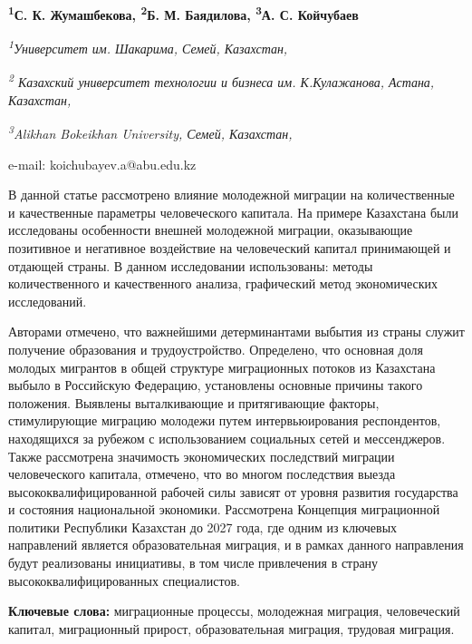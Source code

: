 {{\bfseries \textsuperscript{1}С. К. Жумашбекова, \textsuperscript{2}Б. М.
Баядилова, \textsuperscript{3}А. С. Койчубаев\textsuperscript{\envelope }}

\emph{\textsuperscript{1}Университет им. Шакарима, Семей, Казахстан,}

\emph{\textsuperscript{2} Казахский университет технологии и бизнеса им.
К.Кулажанова, Астана, Казахстан,}

\emph{\textsuperscript{3}Alikhan Bokeikhan University, Семей,
Казахстан,}

e-mail: koichubayev.a@abu.edu.kz

В данной статье рассмотрено влияние молодежной миграции на
количественные и качественные параметры человеческого капитала. На
примере Казахстана были исследованы особенности внешней молодежной
миграции, оказывающие позитивное и негативное воздействие на
человеческий капитал принимающей и отдающей страны. В данном
исследовании использованы: методы количественного и качественного
анализа, графический метод экономических исследований.

Авторами отмечено, что важнейшими детерминантами выбытия из страны
служит получение образования и трудоустройство. Определено, что основная
доля молодых мигрантов в общей структуре миграционных потоков из
Казахстана выбыло в Российскую Федерацию, установлены основные причины
такого положения. Выявлены выталкивающие и притягивающие факторы,
стимулирующие миграцию молодежи путем интервьюирования респондентов,
находящихся за рубежом с использованием социальных сетей и мессенджеров.
Также рассмотрена значимость экономических последствий миграции
человеческого капитала, отмечено, что во многом последствия выезда
высококвалифицированной рабочей силы зависят от уровня развития
государства и состояния национальной экономики. Рассмотрена Концепция
миграционной политики Республики Казахстан до 2027 года, где одним из
ключевых направлений является образовательная миграция, и в рамках
данного направления будут реализованы инициативы, в том числе
привлечения в страну высококвалифицированных специалистов.

{\bfseries Ключевые слова:} миграционные процессы, молодежная миграция,
человеческий капитал, миграционный прирост, образовательная миграция,
трудовая миграция.

}

